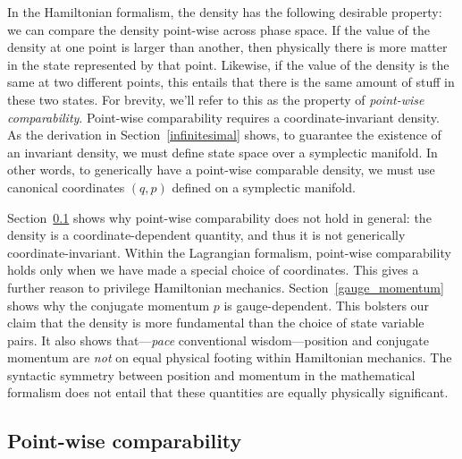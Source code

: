 \documentclass[12pt, english, twoside]{article} %
\begin{document}
In the Hamiltonian formalism, the density has the following desirable property: we can compare the density point-wise across phase space. If the value of the density at one point is larger than another, then physically there is more matter in the state represented by that point. Likewise, if the value of the density is the same at two different points, this entails that there is the same amount of stuff in these two states. For brevity, we'll refer to this as the property of \textit{point-wise comparability}. Point-wise comparability requires a coordinate-invariant density. As the derivation in Section~\ref{infinitesimal} shows, to guarantee the existence of an invariant density, we must define state space over a symplectic manifold. In other words, to generically have a point-wise comparable density, we must use canonical coordinates $(q, p)$ defined on a symplectic manifold. 

Section~\ref{dependence} shows why point-wise comparability does not hold in general: the density is a coordinate-dependent quantity, and thus it is not generically coordinate-invariant. Within the Lagrangian formalism, point-wise comparability holds only when we have made a special choice of coordinates. This gives a further reason to privilege Hamiltonian mechanics. Section~\ref{gauge_momentum} shows why the conjugate momentum $p$ is gauge-dependent. This bolsters our claim that the density is more fundamental than the choice of state variable pairs. It also shows that---\textit{pace} conventional wisdom---position and conjugate momentum are \textit{not} on equal physical footing within Hamiltonian mechanics. The syntactic symmetry between position and momentum in the mathematical formalism does not entail that these quantities are equally physically significant. 


\subsection{Point-wise comparability}
\label{dependence}
\end{document}

